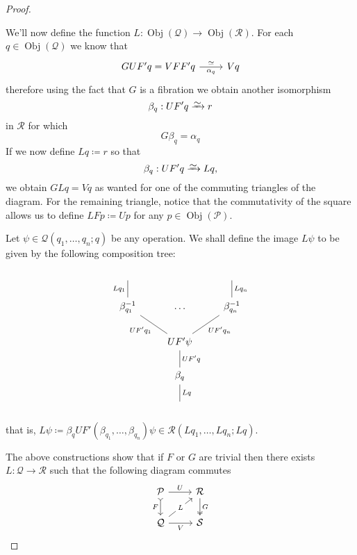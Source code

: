 \documentclass[11pt, reqno]{amsart}
\theoremstyle{definition}
\newcommand{\iso}{\simeq}
\newcommand{\arrowiso}{\iso}
\newcommand{\isoto}{\xrightarrow{\raisebox{-.6ex}[0ex][0ex]{\(\arrowiso\)}}}
\DeclareMathOperator{\Obj}{Obj}   %
\newcommand{\operad}{\mathcal}
\begin{document}
\begin{proof}
\begin{itemize}
        We'll now define the function \(L: \Obj(\operad Q) \to \Obj(\operad
        R)\). For each \(q \in \Obj(\operad Q)\) we know that
        \[
            \begin{tikzcd}
                G U F' q = V F F' q \ar[r, "\iso", "\alpha_q"'] &V q
            \end{tikzcd}
        \]
        therefore using the fact that \(G\) is a fibration we obtain another
        isomorphism 
        \[
            \beta_q: U F' q \isoto r
        \] 
        in \(\operad R\) for which
        \[
            G \beta_q = \alpha_q 
        \]
        If we now define \(L q \coloneq r\) so that
        \[
            \beta_q: UF' q \isoto L q,
        \]
        we obtain \(G L q = V q\) as wanted for one of the commuting triangles
        of the diagram. For the remaining triangle, notice that the
        commutativity of the square allows us to define \(L Fp \coloneq U p\)
        for any \(p \in \Obj(\operad P)\).

        Let \(\psi \in \operad Q(q_1, \dots, q_n; q)\) be any operation. We
        shall define the image \(L \psi\) to be given by the following
        composition tree:
        \[
            \begin{tikzcd}
                \phantom{-} \ar[d, no head, "L q_1"'] 
                &
                &\phantom{-} \ar[d, no head, "L q_n"]
                \\
                \beta^{-1}_{q_1} \ar[rd, no head, "U F' q_1"'] 
                &\dots
                &\beta^{-1}_{q_n} \ar[ld, no head, "U F' q_n"]
                \\
                &U F' \psi \ar[d, no head, "U F' q"] &
                \\
                &\beta_q \ar[d, no head, "L q"] &
                \\
                &\phantom{-} &
            \end{tikzcd}
        \]
        that is, \(L \psi \coloneq \beta_q U F' (\beta_{q_1}, \dots,
        \beta_{q_n}) \psi \in \operad R(L q_1, \dots, L q_n; L q)\).
\end{itemize}
    The above constructions show that if \(F\) or \(G\) are trivial then there
    exists \(L: \operad Q \to \operad R\) such that the following diagram
    commutes
    \[
        \begin{tikzcd}
            \operad P \ar[r, "U"] \ar[d, "F"', tail]
            &\operad R \ar[d, two heads, "G"] \\
            \operad Q \ar[r, "V"'] \ar[ru, "L" description] &\operad S
        \end{tikzcd}
    \]


\end{proof}
\end{document}

